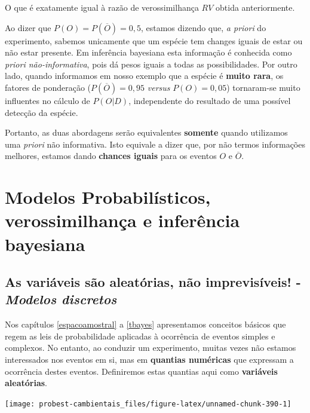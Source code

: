 \documentclass[
]{book}
\begin{document}
O que é exatamente igual à razão de verossimilhança \(RV\) obtida anteriormente.

Ao dizer que \(P(O) = P(\overline{O}) = 0,5\), estamos dizendo que, \emph{a priori} do experimento, sabemos unicamente que um espécie tem changes iguais de estar ou não estar presente. Em inferência bayesiana esta informação é conhecida como \emph{priori não-informativa}, pois dá pesos iguais a todas as possibilidades. Por outro lado, quando informamos em nosso exemplo que a espécie é \textbf{muito rara}, os fatores de ponderação (\(P(\overline{O}) = 0,95\) \emph{versus} \(P(O) = 0,05\)) tornaram-se muito influentes no cálculo de \(P(O|D)\), independente do resultado de uma possível detecção da espécie.

Portanto, as duas abordagens serão equivalentes \textbf{somente} quando utilizamos uma \emph{priori} não informativa. Isto equivale a dizer que, por não termos informações melhores, estamos dando \textbf{chances iguais} para os eventos \(O\) e \(\overline{O}\).

\hypertarget{part-modelos-probabiluxedsticos-verossimilhanuxe7a-e-inferuxeancia-bayesiana}{%
\part{Modelos Probabilísticos, verossimilhança e inferência bayesiana}\label{part-modelos-probabiluxedsticos-verossimilhanuxe7a-e-inferuxeancia-bayesiana}}

\hypertarget{va}{%
\chapter{\texorpdfstring{As variáveis são aleatórias, não imprevisíveis! - \emph{Modelos discretos}}{As variáveis são aleatórias, não imprevisíveis! - Modelos discretos}}\label{va}}

Nos capítulos \ref{espacoamostral} a \ref{tbayes} apresentamos conceitos básicos que regem as leis de probabilidade aplicadas à ocorrência de eventos simples e complexos. No entanto, ao conduzir um experimento, muitas vezes não estamos interessados nos eventos em si, mas em \textbf{quantias numéricas} que expressam a ocorrência destes eventos. Definiremos estas quantias aqui como \textbf{variáveis aleatórias}.

\begin{center}\texttt{[image: probest-cambientais\_files/figure-latex/unnamed-chunk-390-1]} \end{center}
\end{document}

